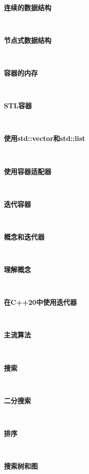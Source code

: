 \noindent\textbf{}\ \par
\textbf{连续的数据结构} \ \par

\noindent\textbf{}\ \par
\textbf{节点式数据结构} \ \par

\noindent\textbf{}\ \par
\textbf{容器的内存} \ \par

\noindent\textbf{}\ \par
\textbf{STL容器} \ \par

\noindent\textbf{}\ \par
\textbf{使用std::vector和std::list} \ \par

\noindent\textbf{}\ \par
\textbf{使用容器适配器} \ \par

\noindent\textbf{}\ \par
\textbf{迭代容器} \ \par

\noindent\textbf{}\ \par
\textbf{概念和迭代器} \ \par

\noindent\textbf{}\ \par
\textbf{理解概念} \ \par

\noindent\textbf{}\ \par
\textbf{在C++20中使用迭代器} \ \par

\noindent\textbf{}\ \par
\textbf{主流算法} \ \par

\noindent\textbf{}\ \par
\textbf{搜索} \ \par

\noindent\textbf{}\ \par
\textbf{二分搜索} \ \par

\noindent\textbf{}\ \par
\textbf{排序} \ \par

\noindent\textbf{}\ \par
\textbf{搜索树和图} \ \par

